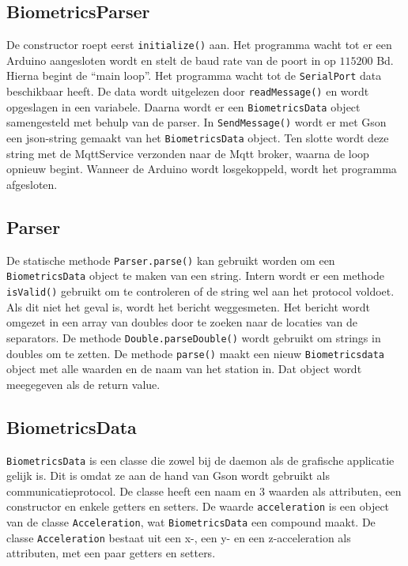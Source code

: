 \documentclass[a4paper]{report}
\newcommand{\code}[1]{\colorbox{light-gray}{\texttt{#1}}}
\begin{document}
        \subsection{BiometricsParser}
            De constructor roept eerst \code{initialize()} aan.
            Het programma wacht tot er een Arduino aangesloten wordt en stelt de baud rate van de poort in op $115200$ Bd.
            Hierna begint de ``main loop''. Het programma wacht tot de \code{SerialPort} data beschikbaar heeft.
            De data wordt uitgelezen door \code{readMessage()} en wordt opgeslagen in een variabele.
            Daarna wordt er een \code{BiometricsData} object samengesteld met behulp van de parser.
            In \code{SendMessage()} wordt er met Gson een json-string gemaakt van het \code{BiometricsData} object.
            Ten slotte wordt deze string met de MqttService verzonden naar de Mqtt broker, waarna de loop opnieuw begint.
            Wanneer de Arduino wordt losgekoppeld, wordt het programma afgesloten.

        \subsection{Parser} 
            De statische methode \code{Parser.parse()} kan gebruikt worden om een \linebreak\code{BiometricsData} object te maken van een string.
            Intern wordt er een methode \code{isValid()} gebruikt om te controleren of de string wel aan het protocol voldoet.
            Als dit niet het geval is, wordt het bericht weggesmeten.
            Het bericht wordt omgezet in een array van doubles door te zoeken naar de locaties van de separators.
            De methode \code{Double.parseDouble()} wordt gebruikt om strings in doubles om te zetten.
            De methode \code{parse()} maakt een nieuw \code{Biometricsdata} object met alle waarden en de naam van het station in.
            Dat object wordt meegegeven als de return value.

        \subsection{BiometricsData}
        \label{sec:biometricdata}
            \code{BiometricsData} is een classe die zowel bij de daemon als de grafische applicatie gelijk is.
            Dit is omdat ze aan de hand van Gson wordt gebruikt als communicatieprotocol.
            De classe heeft een naam en 3 waarden als attributen, een constructor en enkele getters en setters.
            De waarde \code{acceleration} is een object van de classe \code{Acceleration}, wat \code{BiometricsData} een compound maakt.
            De classe \code{Acceleration} bestaat uit een x-, een y- en een z-acceleration als attributen, met een paar getters en setters.
\end{document}
